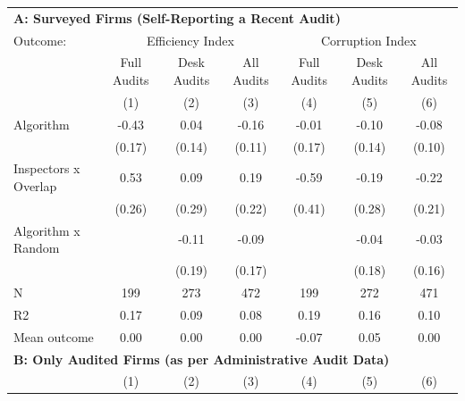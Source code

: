 \begin{tabular}{lccc|ccc} \toprule
\multicolumn{7}{l}{\textbf{A: Surveyed Firms (Self-Reporting a Recent Audit)}} \\ \multicolumn{1}{l}{Outcome:} & \multicolumn{3}{c}{Efficiency Index} & \multicolumn{3}{c}{Corruption Index} \\ \multicolumn{1}{l}{} & Full Audits & Desk Audits & All Audits & Full Audits & Desk Audits & All Audits \\ \multicolumn{1}{l}{} & (1) & (2) & (3) & (4) & (5) & (6) \\ \midrule
Algorithm   &       -0.43\sym{**} &        0.04         &       -0.16         &       -0.01         &       -0.10         &       -0.08         \\
            &      (0.17)         &      (0.14)         &      (0.11)         &      (0.17)         &      (0.14)         &      (0.10)         \\
\addlinespace
Inspectors x Overlap&        0.53\sym{**} &        0.09         &        0.19         &       -0.59         &       -0.19         &       -0.22         \\
            &      (0.26)         &      (0.29)         &      (0.22)         &      (0.41)         &      (0.28)         &      (0.21)         \\
\addlinespace
Algorithm x Random&                     &       -0.11         &       -0.09         &                     &       -0.04         &       -0.03         \\
            &                     &      (0.19)         &      (0.17)         &                     &      (0.18)         &      (0.16)         \\
\midrule
N           &         199         &         273         &         472         &         199         &         272         &         471         \\
R2          &        0.17         &        0.09         &        0.08         &        0.19         &        0.16         &        0.10         \\
Mean outcome&        0.00         &        0.00         &        0.00         &       -0.07         &        0.05         &        0.00         \\

\midrule \multicolumn{7}{l}{\textbf{B: Only Audited Firms (as per Administrative Audit Data)}} \\ \multicolumn{1}{l}{} & (1) & (2) & (3) & (4) & (5) & (6) \\ \midrule


\end{tabular}
